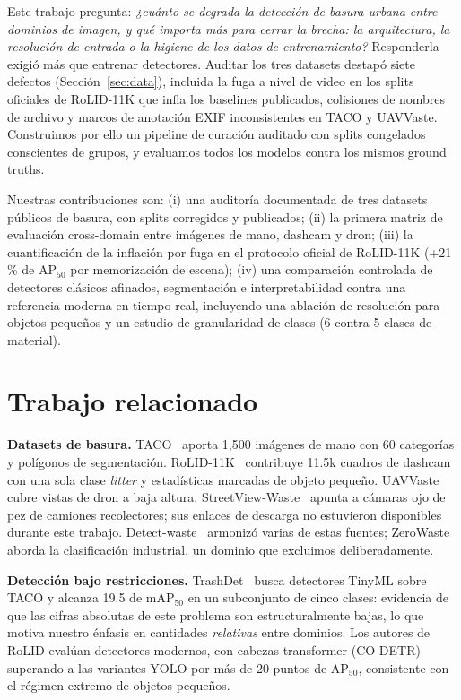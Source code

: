\documentclass[conference]{IEEEtran}
\begin{document}
Este trabajo pregunta: \emph{¿cuánto se degrada la detección de basura urbana
entre dominios de imagen, y qué importa más para cerrar la brecha: la
arquitectura, la resolución de entrada o la higiene de los datos de
entrenamiento?} Responderla exigió más que entrenar detectores. Auditar los tres
datasets destapó siete defectos (Sección~\ref{sec:data}), incluida la fuga a
nivel de video en los splits oficiales de RoLID-11K que infla los baselines
publicados, colisiones de nombres de archivo y marcos de anotación EXIF
inconsistentes en TACO y UAVVaste. Construimos por ello un pipeline de curación
auditado con splits congelados conscientes de grupos, y evaluamos todos los
modelos contra los mismos ground truths.

Nuestras contribuciones son:
(i) una auditoría documentada de tres datasets públicos de basura, con splits
corregidos y publicados;
(ii) la primera matriz de evaluación cross-domain entre imágenes de mano,
dashcam y dron;
(iii) la cuantificación de la inflación por fuga en el protocolo oficial de
RoLID-11K (+21\,\% de AP$_{50}$ por memorización de escena);
(iv) una comparación controlada de detectores clásicos afinados, segmentación e
interpretabilidad contra una referencia moderna en tiempo real, incluyendo una
ablación de resolución para objetos pequeños y un estudio de granularidad de
clases (6 contra 5 clases de material).

\section{Trabajo relacionado}
\textbf{Datasets de basura.} TACO~\cite{taco} aporta 1{,}500 imágenes de mano
con 60 categorías y polígonos de segmentación. RoLID-11K~\cite{rolid} contribuye
11.5k cuadros de dashcam con una sola clase \emph{litter} y estadísticas
marcadas de objeto pequeño. UAVVaste~\cite{uavvaste} cubre vistas de dron a baja
altura. StreetView-Waste~\cite{streetview} apunta a cámaras ojo de pez de
camiones recolectores; sus enlaces de descarga no estuvieron disponibles durante
este trabajo. Detect-waste~\cite{detectwaste} armonizó varias de estas fuentes;
ZeroWaste~\cite{zerowaste} aborda la clasificación industrial, un dominio que
excluimos deliberadamente.

\textbf{Detección bajo restricciones.} TrashDet~\cite{trashdet} busca detectores
TinyML sobre TACO y alcanza 19.5 de mAP$_{50}$ en un subconjunto de cinco
clases: evidencia de que las cifras absolutas de este problema son
estructuralmente bajas, lo que motiva nuestro énfasis en cantidades
\emph{relativas} entre dominios. Los autores de RoLID evalúan detectores
modernos, con cabezas transformer (CO-DETR) superando a las variantes YOLO por
más de 20 puntos de AP$_{50}$, consistente con el régimen extremo de objetos
pequeños.
\end{document}
